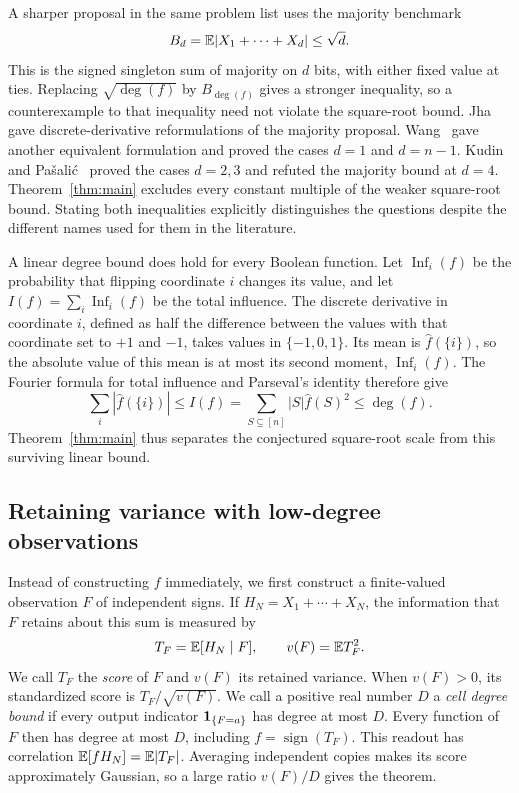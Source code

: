 A sharper proposal in the same problem list uses the majority benchmark
\[
 B_d=\mathbb E|X_1+\cdots+X_d|\le\sqrt d.
\]
This is the signed singleton sum of majority on \(d\) bits, with either
fixed value at ties. Replacing \(\sqrt{\deg(f)}\) by
\(B_{\deg(f)}\) gives a stronger inequality, so a counterexample to
that inequality need not violate the square-root bound.
Jha~\cite[Theorem 2.1]{Jha} gave discrete-derivative reformulations of
the majority proposal. Wang~\cite[Theorems 2.2, 3.2 and 3.6]{Wang}
gave another equivalent formulation and proved the cases \(d=1\) and
\(d=n-1\). Kudin and Pa\v{s}ali\'c~\cite{KudinPasalic} proved the
cases \(d=2,3\) and refuted the majority bound at \(d=4\).
Theorem~\ref{thm:main} excludes every constant multiple of the weaker
square-root bound. Stating both inequalities explicitly distinguishes
the questions despite the different names used for them in the literature.

A linear degree bound does hold for every Boolean function. Let
\(\operatorname{Inf}_i(f)\) be the probability that flipping coordinate
\(i\) changes its value, and let
\(I(f)=\sum_i\operatorname{Inf}_i(f)\) be the total influence.
The discrete derivative in coordinate \(i\), defined as half the
difference between the values with that coordinate set to \(+1\) and
\(-1\), takes values in \(\{-1,0,1\}\). Its mean is
\(\widehat f(\{i\})\), so the absolute value of this mean is at most
its second moment, \(\operatorname{Inf}_i(f)\). The Fourier formula
for total influence and Parseval's identity therefore give
\cite[Lemma~2.4 and Corollary~2.5]{NisanSzegedy}
\[
 \sum_i|\widehat f(\{i\})|
 \le I(f)=\sum_{S\subseteq[n]}|S|\widehat f(S)^2
 \le\deg(f).
\]
Theorem~\ref{thm:main} thus separates the conjectured square-root
scale from this surviving linear bound.

\subsection*{Retaining variance with low-degree observations}
Instead of constructing \(f\) immediately, we first construct a
finite-valued observation \(F\) of independent signs. If
\(H_N=X_1+\cdots+X_N\), the information that \(F\) retains about this
sum is measured by
\[
 T_F=\mathbb E[H_N\mid F],\qquad v(F)=\mathbb E T_F^2.
\]
We call \(T_F\) the \emph{score} of \(F\) and \(v(F)\) its retained
variance. When \(v(F)>0\), its standardized score is
\(T_F/\sqrt{v(F)}\). We call a positive real number \(D\) a \emph{cell degree bound} if
 every output indicator \(\mathbf 1_{\{F=a\}}\) has degree at most \(D\). Every function of
\(F\) then has degree at most \(D\), including
\(f=\operatorname{sign}(T_F)\). This readout has correlation
\(\mathbb E[fH_N]=\mathbb E|T_F|\). Averaging independent copies makes its score
approximately Gaussian, so a large ratio \(v(F)/D\) gives the theorem.

